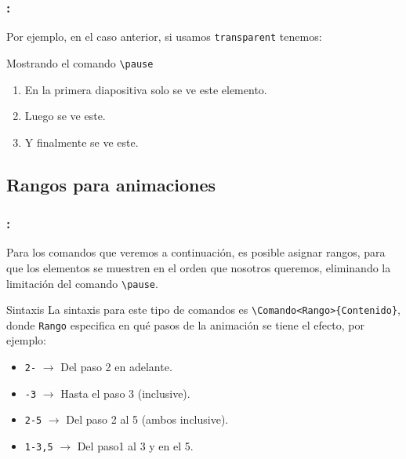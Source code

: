 \documentclass[11pt]{beamer}	%
\begin{document}
\begin{frame}
	\frametitle{\secname : \subsecname}
	
	Por ejemplo, en el caso anterior, si usamos \texttt{transparent} tenemos:
		
	\begin{block}{Mostrando el comando \texttt{\textbackslash pause}}
	\begin{enumerate}
		\item En la primera diapositiva solo se ve este elemento.	\pause
		\item Luego se ve este.							\pause
		\item Y finalmente se ve este.						
	\end{enumerate}
	\end{block}
\end{frame}
	
\subsection{Rangos para animaciones}
\begin{frame}
	\frametitle{\secname : \subsecname}
	
	Para los comandos que veremos a continuación, es posible asignar rangos, para que los elementos se muestren en el orden que nosotros queremos, eliminando la limitación del comando \texttt{\textbackslash pause}.
	
	\begin{block}{Sintaxis}
		La sintaxis para este tipo de comandos es \texttt{\textbackslash Comando<Rango>\{Contenido\}},  donde \texttt{Rango} especifica en qué pasos de la animación se tiene el efecto, por ejemplo:
			\begin{itemize}
				\item \texttt{2-} $\rightarrow$ Del paso 2 en adelante.
				\item \texttt{-3} $\rightarrow$ Hasta el paso 3 (inclusive).
				\item \texttt{2-5} $\rightarrow$ Del paso 2 al 5 (ambos inclusive).
				\item \texttt{1-3,5} $\rightarrow$ Del paso1 al 3 y en el 5.
			\end{itemize}
	\end{block}
\end{frame}

\end{document}
